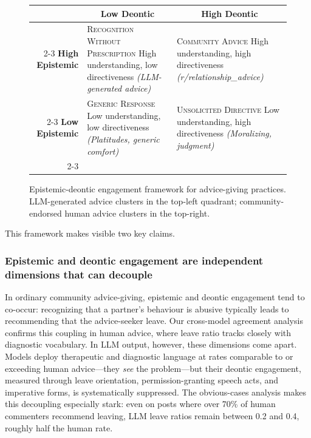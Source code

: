 \begin{figure}[t]
    \centering
    \begin{tabular}{r|p{3.8cm}|p{3.8cm}|}
    \multicolumn{1}{c}{} & \multicolumn{1}{c}{\textbf{Low Deontic}} & \multicolumn{1}{c}{\textbf{High Deontic}} \\
    \cline{2-3}
    \textbf{High Epistemic} & \textsc{Recognition Without Prescription} \newline \footnotesize{High understanding, low directiveness} \newline \footnotesize{\textit{(LLM-generated advice)}} & \textsc{Community Advice} \newline \footnotesize{High understanding, high directiveness} \newline \footnotesize{\textit{(r/relationship\_advice)}} \\
    \cline{2-3}
    \textbf{Low Epistemic} & \textsc{Generic Response} \newline \footnotesize{Low understanding, low directiveness} \newline \footnotesize{\textit{(Platitudes, generic comfort)}} & \textsc{Unsolicited Directive} \newline \footnotesize{Low understanding, high directiveness} \newline \footnotesize{\textit{(Moralizing, judgment)}} \\
    \cline{2-3}
    \end{tabular}
    \caption{Epistemic-deontic engagement framework for advice-giving practices. LLM-generated advice clusters in the top-left quadrant; community-endorsed human advice clusters in the top-right.}
    \label{fig:framework}
\end{figure}

This framework makes visible two key claims.

\subsubsection{Epistemic and deontic engagement are independent dimensions that can decouple}

In ordinary community advice-giving, epistemic and deontic engagement tend to co-occur: recognizing that a partner's behaviour is abusive typically leads to recommending that the advice-seeker leave. Our cross-model agreement analysis confirms this coupling in human advice, where leave ratio tracks closely with diagnostic vocabulary. In LLM output, however, these dimensions come apart. Models deploy therapeutic and diagnostic language at rates comparable to or exceeding human advice---they \textit{see} the problem---but their deontic engagement, measured through leave orientation, permission-granting speech acts, and imperative forms, is systematically suppressed. The obvious-cases analysis makes this decoupling especially stark: even on posts where over 70\% of human commenters recommend leaving, LLM leave ratios remain between 0.2 and 0.4, roughly half the human rate.

